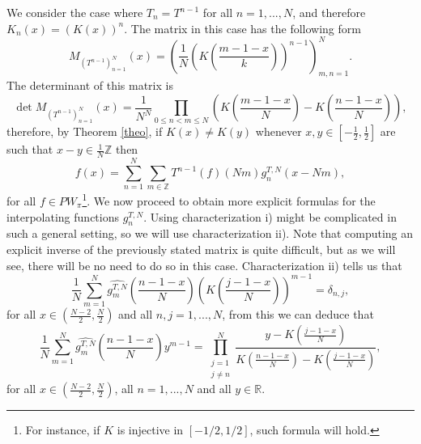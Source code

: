 \documentclass[reqno]{amsart}
\theoremstyle{plain}
\theoremstyle{definition}
\numberwithin{equation}{section}
\newcommand{\Z}{{\mathbb Z}}
\newcommand{\R}{{\mathbb R}}
\newcommand{\pa}[1]{\left(#1\right)}
\begin{document}
We consider the case where $T_n= T^{n-1}$ for all $n=1,...,N$, and therefore $K_n(x)=\pa{K(x)}^n$. The matrix in this case has the following form
$$M_{\pa{T^{n-1}}_{n=1}^N}(x)=\pa{\frac{1}{N}\pa{K\pa{\frac{m-1-x}{k}}}^{n-1}}_{m,n=1}^N.$$
The determinant of this matrix is 
$$\det M_{\pa{T^{n-1}}_{n=1}^N}(x)=\frac{1}{N^N} \prod_{0\leq n< m\leq N} \pa{K\pa{\frac{m-1-x}{N}}-K\pa{\frac{n-1-x}{N}}},$$
therefore, by Theorem \ref{theo}, if $K(x)\neq K(y)$ whenever $x,y\in[-\frac{1}{2},\frac{1}{2}]$ are such that $x-y\in \frac{1}{N}\Z$ then 
$$f(x)=\sum_{n=1}^N \sum_{m\in\Z} T^{n-1}(f)(Nm) g^{T,N}_{n}(x-Nm),$$
for all $f\in PW_\pi$\footnote{For instance, if $K$ is injective in $[-1/2,1/2]$, such formula will hold.}. We now proceed to obtain  more explicit formulas for the interpolating functions $g^{T,N}_{n}$. Using characterization i) might be complicated in such a general setting, so we will use characterization ii). Note that computing an explicit inverse of the previously stated matrix is quite difficult, but as we will see, there will be no need to do so in this case. Characterization ii) tells us that
$$\frac{1}{N}\sum_{m=1}^N \widehat{g^{T,N}_m}\pa{\frac{n-1-x}{N}} \pa{K\pa{\frac{j-1-x}{N}}}^{m-1}=\delta_{n,j},$$
for all $x\in \pa{\frac{N-2}{2},\frac{N}{2}}$ and all $n,j=1,...,N$, from this we can deduce that
\begin{equation} \label{DynSam1}
    \frac{1}{N}\sum_{m=1}^N \widehat{g^{T,N}_m}\pa{\frac{n-1-x}{N}} y^{m-1}
    =\prod_{\substack{j=1 \\ j\neq n}}^N \frac{y-K\pa{\frac{j-1-x}{N}}}{K\pa{\frac{n-1-x}{N}}-K\pa{\frac{j-1-x}{N}}},
\end{equation}
for all $x\in \pa{\frac{N-2}{2},\frac{N}{2}}$, all $n=1,...,N$ and all $y\in\R$. 
\end{document}
